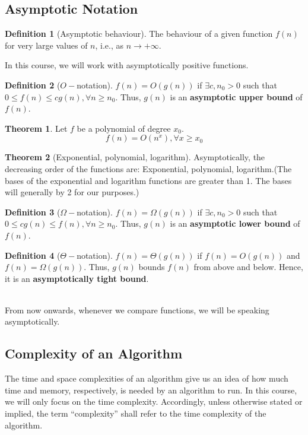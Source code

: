 \documentclass[10pt, a4paper]{extarticle}
\theoremstyle{definition}
\newtheorem{thm}{Theorem}
\newtheorem{defn}{Definition}
\begin{document}
	\subsection{Asymptotic Notation}
	\begin{defn}[Asymptotic behaviour]
		The behaviour of a given function $f(n)$ for very large values of $n$, i.e., as $n\to +\infty$.
	\end{defn}
	In this course, we will work with asymptotically positive functions.
	\begin{defn}[$O-$notation]
		$f(n)=O(g(n))$ if $\exists c,n_0>0$ such that $0\leq f(n)\leq cg(n),\forall n\geq n_0$. Thus, $g(n)$ is an \textbf{asymptotic upper bound} of $f(n)$.
	\end{defn}
	\begin{thm}
		Let $f$ be a polynomial of degree $x_0$.
		\[f(n)=O(n^x),\forall x\geq x_0\]
	\end{thm}
	\begin{thm}[Exponential, polynomial, logarithm]
		Asymptotically, the decreasing order of the functions are: Exponential, polynomial, logarithm.(The bases of the exponential and logarithm functions are greater than 1. The bases will generally by 2 for our purposes.)
	\end{thm}

	\begin{defn}[$\Omega-$notation]
		$f(n)=\Omega(g(n))$ if $\exists c,n_0>0$ such that $0\leq cg(n)\leq f(n),\forall n\geq n_0$. Thus, $g(n)$ is an \textbf{asymptotic lower bound} of $f(n)$.
	\end{defn}
	\begin{defn}[$\Theta-$notation]
		$f(n)=\Theta(g(n))$ if $f(n)=O(g(n))$ and $f(n)=\Omega(g(n))$. Thus, $g(n)$ bounds $f(n)$ from above and below. Hence, it is an \textbf{asymptotically tight bound}.
	\end{defn}
	\hfill\\
	From now onwards, whenever we compare functions, we will be speaking asymptotically.
	\subsection{Complexity of an Algorithm}
	The time and space complexities of an algorithm give us an idea of how much time and memory, respectively, is needed by an algorithm to run. In this course, we will only focus on the time complexity. Accordingly, unless otherwise stated or implied, the term “complexity” shall refer to the time complexity of the algorithm.
\end{document}
